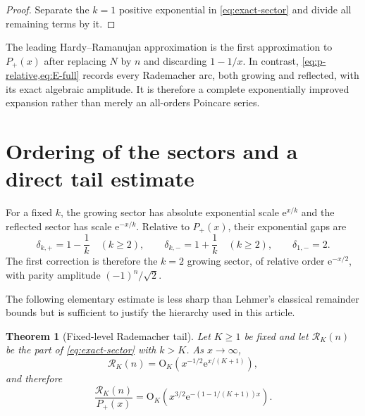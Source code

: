 \documentclass[11pt,a4paper]{article}
\numberwithin{equation}{section}
\newtheorem{theorem}{Theorem}[section]
\theoremstyle{remark}
\newcommand{\e}{\mathrm e}
\newcommand{\Rcal}{\mathcal R}
\newcommand{\bigO}{\mathrm O}
\begin{document}
\begin{proof}
Separate the $k=1$ positive exponential in \cref{eq:exact-sector} and divide all remaining terms by it.
\end{proof}

\begin{resultbox}[Interpretation]
The leading Hardy--Ramanujan approximation is the first approximation to $P_+(x)$ after replacing $N$ by $n$ and discarding $1-1/x$.  In contrast, \cref{eq:p-relative,eq:E-full} records every Rademacher arc, both growing and reflected, with its exact algebraic amplitude.  It is therefore a complete exponentially improved expansion rather than merely an all-orders Poincare series.
\end{resultbox}

\section{Ordering of the sectors and a direct tail estimate}\label{sec:tail}

For a fixed $k$, the growing sector has absolute exponential scale $\e^{x/k}$ and the reflected sector has scale $\e^{-x/k}$.  Relative to $P_+(x)$, their exponential gaps are
\begin{equation}\label{eq:gaps}
 \delta_{k,+}=1-\frac1k\quad(k\ge2),\qquad
 \delta_{k,-}=1+\frac1k\quad(k\ge2),\qquad
 \delta_{1,-}=2.
\end{equation}
The first correction is therefore the $k=2$ growing sector, of relative order $\e^{-x/2}$, with parity amplitude $(-1)^n/\sqrt2$.

The following elementary estimate is less sharp than Lehmer's classical remainder bounds but is sufficient to justify the hierarchy used in this article.

\begin{theorem}[Fixed-level Rademacher tail]\label{thm:rough-tail}
Let $K\ge1$ be fixed and let $\Rcal_K(n)$ be the part of \cref{eq:exact-sector} with $k>K$.  As $x\to\infty$,
\begin{equation}\label{eq:rough-tail-absolute}
 \Rcal_K(n)=\bigO_K\!\left(x^{-1/2}\e^{x/(K+1)}\right),
\end{equation}
and therefore
\begin{equation}\label{eq:rough-tail-relative}
 \frac{\Rcal_K(n)}{P_+(x)}
 =\bigO_K\!\left(x^{3/2}
 \e^{-(1-1/(K+1))x}\right).
\end{equation}
\end{theorem}
\end{document}
